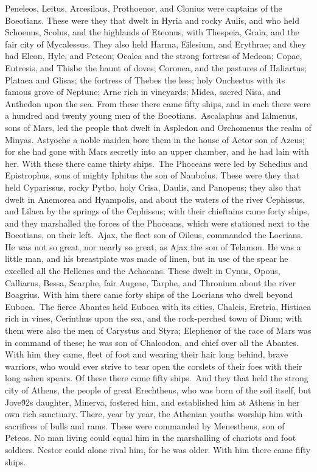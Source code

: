 {Peneleos, Leitus, Arcesilaus, Prothoenor, and Clonius were captains of the Boeotians. These were they that dwelt in Hyria and rocky Aulis, and who held Schoenus, Scolus, and the highlands of Eteonus, with Thespeia, Graia, and the fair city of Mycalessus. They also held Harma, Eilesium, and Erythrae; and they had Eleon, Hyle, and Peteon; Ocalea and the strong fortress of Medeon; Copae, Eutresis, and Thisbe the haunt of doves; Coronea, and the pastures of Haliartus; Plataea and Glisas; the fortress of Thebes the less; holy Onchestus with its famous grove of Neptune; Arne rich in vineyards; Midea, sacred Nisa, and Anthedon upon the sea. From these there came fifty ships, and in each there were a hundred and twenty young men of the Boeotians.\
Ascalaphus and Ialmenus, sons of Mars, led the people that dwelt in Aspledon and Orchomenus the realm of Minyas. Astyoche a noble maiden bore them in the house of Actor son of Azeus; for she had gone with Mars secretly into an upper chamber, and he had lain with her. With these there came thirty ships.\
The Phoceans were led by Schedius and Epistrophus, sons of mighty Iphitus the son of Naubolus. These were they that held Cyparissus, rocky Pytho, holy Crisa, Daulis, and Panopeus; they also that dwelt in Anemorea and Hyampolis, and about the waters of the river Cephissus, and Lilaea by the springs of the Cephissus; with their chieftains came forty ships, and they marshalled the forces of the Phoceans, which were stationed next to the Boeotians, on their left.\
Ajax, the fleet son of Oileus, commanded the Locrians. He was not so great, nor nearly so great, as Ajax the son of Telamon. He was a little man, and his breastplate was made of linen, but in use of the spear he excelled all the Hellenes and the Achaeans. These dwelt in Cynus, Opous, Calliarus, Bessa, Scarphe, fair Augeae, Tarphe, and Thronium about the river Boagrius. With him there came forty ships of the Locrians who dwell beyond Euboea.\
The fierce Abantes held Euboea with its cities, Chalcis, Eretria, Histiaea rich in vines, Cerinthus upon the sea, and the rock-perched town of Dium; with them were also the men of Carystus and Styra; Elephenor of the race of Mars was in command of these; he was son of Chalcodon, and chief over all the Abantes. With him they came, fleet of foot and wearing their hair long behind, brave warriors, who would ever strive to tear open the corslets of their foes with their long ashen spears. Of these there came fifty ships.\
And they that held the strong city of Athens, the people of great Erechtheus, who was born of the soil itself, but Jove\'92s daughter, Minerva, fostered him, and established him at Athens in her own rich sanctuary. There, year by year, the Athenian youths worship him with sacrifices of bulls and rams. These were commanded by Menestheus, son of Peteos. No man living could equal him in the marshalling of chariots and foot soldiers. Nestor could alone rival him, for he was older. With him there came fifty ships.\
}
